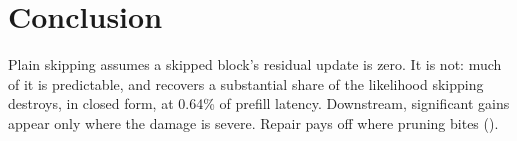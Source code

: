 \section{Conclusion}
\label{sec:conclusion}

Plain skipping assumes a skipped block's residual update is zero. It is not: much of it is
predictable, and \mname recovers a substantial share of the likelihood skipping destroys, in
closed form, at 0.64\% of prefill latency. Downstream, significant gains appear only where the
damage is severe. Repair pays off where pruning bites ().
